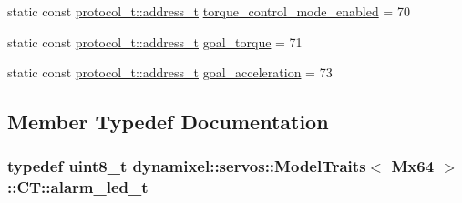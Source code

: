 \begin{DoxyCompactItemize}
\item 
static const \hyperlink{classdynamixel_1_1protocols_1_1_protocol1_a4383ba392b57ea00dd0273c6da5e8a65}{protocol\+\_\+t\+::address\+\_\+t} \hyperlink{structdynamixel_1_1servos_1_1_model_traits_3_01_mx64_01_4_1_1_c_t_ac1ebc5d82a076745062a6656ae09eebe}{torque\+\_\+control\+\_\+mode\+\_\+enabled} = 70
\item 
static const \hyperlink{classdynamixel_1_1protocols_1_1_protocol1_a4383ba392b57ea00dd0273c6da5e8a65}{protocol\+\_\+t\+::address\+\_\+t} \hyperlink{structdynamixel_1_1servos_1_1_model_traits_3_01_mx64_01_4_1_1_c_t_a56999131b7aa5df5d3c6e95ad4133609}{goal\+\_\+torque} = 71
\item 
static const \hyperlink{classdynamixel_1_1protocols_1_1_protocol1_a4383ba392b57ea00dd0273c6da5e8a65}{protocol\+\_\+t\+::address\+\_\+t} \hyperlink{structdynamixel_1_1servos_1_1_model_traits_3_01_mx64_01_4_1_1_c_t_a0ba7ef75b82682edba4cf19861063ea2}{goal\+\_\+acceleration} = 73
\end{DoxyCompactItemize}


\subsection{Member Typedef Documentation}
\subsubsection[{\texorpdfstring{alarm\+\_\+led\+\_\+t}{alarm_led_t}}]{\setlength{\rightskip}{0pt plus 5cm}typedef uint8\+\_\+t {\bf dynamixel\+::servos\+::\+Model\+Traits}$<$ {\bf Mx64} $>$\+::{\bf C\+T\+::alarm\+\_\+led\+\_\+t}}\hypertarget{structdynamixel_1_1servos_1_1_model_traits_3_01_mx64_01_4_1_1_c_t_a167cb35aa41c242252f5eb9fb1b5dcfa}{}\label{structdynamixel_1_1servos_1_1_model_traits_3_01_mx64_01_4_1_1_c_t_a167cb35aa41c242252f5eb9fb1b5dcfa}
